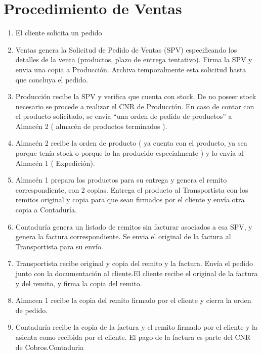 \section{Procedimiento de Ventas}
  \begin{enumerate}
  \item El cliente solicita un pedido
  \item Ventas genera la Solicitud de Pedido de Ventas (SPV) especificando los detalles de la venta (productos, plazo de entrega tentativo).
	  Firma la SPV y envia una copia a Producci\'on. Archiva temporalmente esta solicitud hasta que concluya el pedido.
  \item Producci\'on recibe la SPV y verifica que cuenta con stock. De no poseer stock necesario se procede a realizar el CNR de Producci\'on. 
	  En caso de contar con el producto solicitado, se envia ``una orden de pedido de productos'' a Almac\'en 2 ( almacén de productos terminados ).
  \item Almac\'en 2 recibe la orden de producto ( ya cuenta con el producto, ya sea porque ten\'ia stock o porque lo ha producido especialmente ) y lo env\'ia al  Almac\'en 1 ( Expedici\'on).
  \item Almac\'en 1 prepara los productos para su entrega y genera el remito correspondiente, con 2 copias. Entrega el producto al Transportista con los remitos original y copia para que sean firmados por el cliente y env\'ia otra copia a Contadur\'ia.
  \item Contadur\'ia genera un listado de remitos sin facturar asociados a esa SPV, y genera la factura correspondiente. Se envia el original de la factura al Transportista para su env\'io.
  \item Transportista recibe original y copia del remito y la factura. Env\'ia el pedido junto con la documentaci\'on al cliente.El cliente recibe el original de la factura y del remito, y firma la copia del remito.
  \item Almacen 1 recibe la copia del remito firmado por el cliente y cierra la orden de pedido. 
  \item Contadur\'ia recibe la copia de la factura y el remito firmado por el cliente y la asienta como recibida por el cliente. El pago de la factura es parte del CNR de Cobros.Contaduria
  \end{enumerate}
